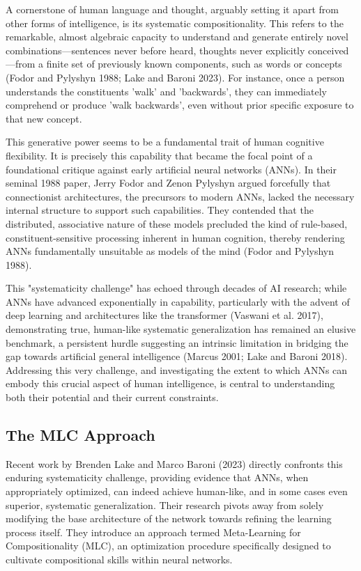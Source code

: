\documentclass[
10pt, %
a4paper, %
oneside, %
headinclude,footinclude, %
BCOR5mm, %
]{scrartcl}
\begin{document}
A cornerstone of human language and thought, arguably setting it apart from other forms of intelligence, is its systematic compositionality. This refers to the remarkable, almost algebraic capacity to understand and generate entirely novel combinations—sentences never before heard, thoughts never explicitly conceived—from a finite set of previously known components, such as words or concepts (Fodor and Pylyshyn 1988; Lake and Baroni 2023). For instance, once a person understands the constituents 'walk' and 'backwards', they can immediately comprehend or produce 'walk backwards', even without prior specific exposure to that new concept. 

This generative power seems to be a fundamental trait of human cognitive flexibility. It is precisely this capability that became the focal point of a foundational critique against early artificial neural networks (ANNs). In their seminal 1988 paper, Jerry Fodor and Zenon Pylyshyn argued forcefully that connectionist architectures, the precursors to modern ANNs, lacked the necessary internal structure to support such capabilities. They contended that the distributed, associative nature of these models precluded the kind of rule-based, constituent-sensitive processing inherent in human cognition, thereby rendering ANNs fundamentally unsuitable as models of the mind (Fodor and Pylyshyn 1988). 

This "systematicity challenge" has echoed through decades of AI research; while ANNs have advanced exponentially in capability, particularly with the advent of deep learning and architectures like the transformer (Vaswani et al. 2017), demonstrating true, human-like systematic generalization has remained an elusive benchmark, a persistent hurdle suggesting an intrinsic limitation in bridging the gap towards artificial general intelligence (Marcus 2001; Lake and Baroni 2018). Addressing this very challenge, and investigating the extent to which ANNs can embody this crucial aspect of human intelligence, is central to understanding both their potential and their current constraints.

\subsection{The MLC Approach}

Recent work by Brenden Lake and Marco Baroni (2023) directly confronts this enduring systematicity challenge, providing evidence that ANNs, when appropriately optimized, can indeed achieve human-like, and in some cases even superior, systematic generalization. Their research pivots away from solely modifying the base architecture of the network towards refining the learning process itself. They introduce an approach termed Meta-Learning for Compositionality (MLC), an optimization procedure specifically designed to cultivate compositional skills within neural networks. 
\end{document}
